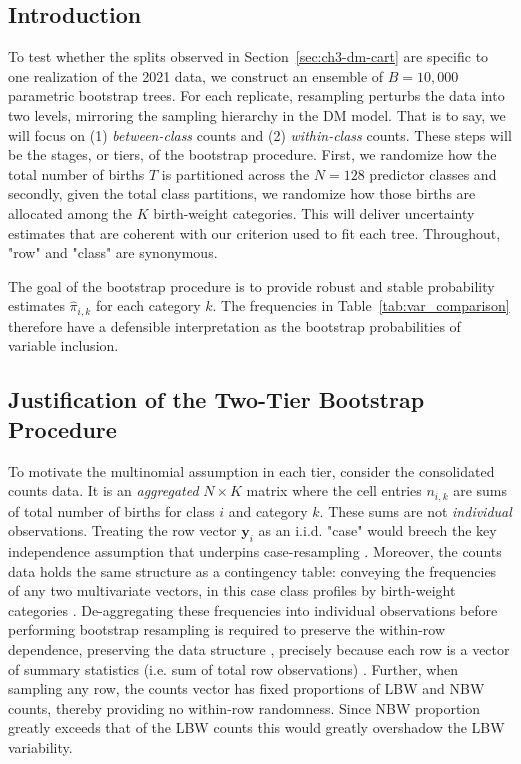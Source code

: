 \subsection{Introduction}
\label{sec:ch3-boot-intro}
To test whether the splits observed in Section~\ref{sec:ch3-dm-cart} are specific to one realization of the 2021 data, we construct an ensemble of \(B =10,000\) parametric bootstrap trees. For each replicate, resampling perturbs the data into two levels, mirroring the sampling hierarchy in the DM model. That is to say, we will focus on (1) \emph{between-class} counts and (2) \emph{within-class} counts. These steps will be the stages, or tiers, of the bootstrap procedure. First, we randomize how the total number of births \(T\) is partitioned across the \(N=128\) predictor classes and secondly, given the total class partitions, we randomize how those births are allocated among the \(K\) birth-weight categories. This will deliver uncertainty estimates that are coherent with our criterion used to fit each tree. Throughout, "row" and "class" are synonymous. 

The goal of the bootstrap procedure is to provide robust and stable probability estimates \(\hat{\pi}_{i,k}\) for each category \(k\). The frequencies in Table~\ref{tab:var_comparison} therefore have a defensible interpretation as the bootstrap probabilities of variable inclusion.

\subsection{Justification of the Two-Tier Bootstrap Procedure}
\label{sec:ch3-justifiaction}
To motivate the multinomial assumption in each tier, consider the consolidated counts data. It is an \emph{aggregated} \(N \times K\) matrix where the cell entries \(n_{i,k}\) are sums of total number of births for class \(i\) and category \(k\). These sums are not \emph{individual} observations. Treating the row vector \(\mathbf{y}_i\) as an i.i.d. "case" would breech the key independence assumption that underpins case-resampling \citep[slide 47]{case_resampling} \citep{math10244671}. Moreover, the counts data holds the same structure as a contingency table: conveying the frequencies of any two multivariate vectors, in this case class profiles by birth-weight categories \citep{wiki:contingency}. De-aggregating these frequencies into individual observations before performing bootstrap resampling is required to preserve the within-row dependence, preserving the data structure \citep{stackexchangeBootstrapResampling}, precisely because each row is a vector of summary statistics (i.e. sum of total row observations) \citep{wiki:summary_statistic}. Further, when sampling any row, the counts vector has fixed proportions of LBW and NBW counts, thereby providing no within-row randomness. Since NBW proportion greatly exceeds that of the LBW counts this would greatly overshadow the LBW variability.

